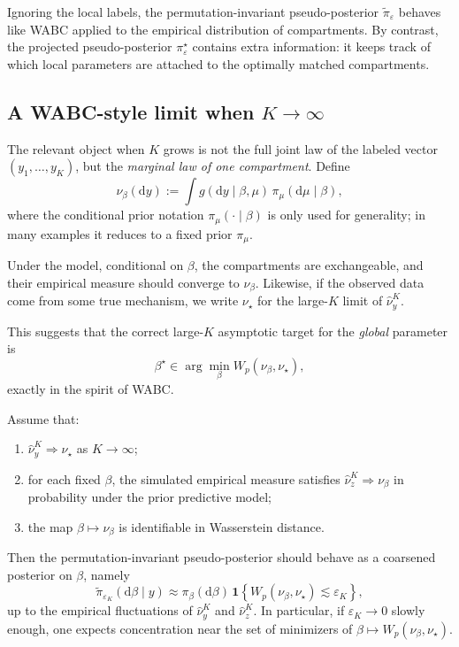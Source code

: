 \begin{remark}
Ignoring the local labels, the permutation-invariant pseudo-posterior $\tilde\pi_\varepsilon$
behaves like WABC applied to the empirical distribution of compartments. By contrast, the
projected pseudo-posterior $\pi_\varepsilon^\star$ contains extra information: it keeps track of
which local parameters are attached to the optimally matched compartments.
\end{remark}

\subsection{A WABC-style limit when $K \to \infty$}

The relevant object when $K$ grows is not the full joint law of the labeled vector
$(y_1,\dots,y_K)$, but the \emph{marginal law of one compartment}. Define
\[
  \nu_\beta(\mathrm dy)
  := \int g(\mathrm dy\mid \beta,\mu)\,\pi_\mu(\mathrm d\mu\mid \beta),
\]
where the conditional prior notation $\pi_\mu(\cdot\mid \beta)$ is only used for generality; in
many examples it reduces to a fixed prior $\pi_\mu$.

Under the model, conditional on $\beta$, the compartments are exchangeable, and their empirical
measure should converge to $\nu_\beta$. Likewise, if the observed data come from some true
mechanism, we write $\nu_\star$ for the large-$K$ limit of $\widehat\nu_y^K$.

This suggests that the correct large-$K$ asymptotic target for the \emph{global} parameter is
\[
  \beta^\star \in \arg\min_{\beta} W_p(\nu_\beta,\nu_\star),
\]
exactly in the spirit of WABC.

\begin{proposition}
Assume that:
\begin{enumerate}
  \item $\widehat\nu_y^K \Rightarrow \nu_\star$ as $K\to\infty$;
  \item for each fixed $\beta$, the simulated empirical measure satisfies
  $\widehat\nu_z^K \Rightarrow \nu_\beta$ in probability under the prior predictive model;
  \item the map $\beta \mapsto \nu_\beta$ is identifiable in Wasserstein distance.
\end{enumerate}
Then the permutation-invariant pseudo-posterior should behave as a coarsened posterior on
$\beta$, namely
\[
  \tilde\pi_{\varepsilon_K}(\mathrm d\beta\mid y)
  \approx
  \pi_\beta(\mathrm d\beta)\,
  \mathbf 1\!\left\{W_p(\nu_\beta,\nu_\star) \lesssim \varepsilon_K\right\},
\]
up to the empirical fluctuations of $\widehat\nu_y^K$ and $\widehat\nu_z^K$.
In particular, if $\varepsilon_K \to 0$ slowly enough, one expects concentration near the set of
minimizers of $\beta \mapsto W_p(\nu_\beta,\nu_\star)$.
\end{proposition}

